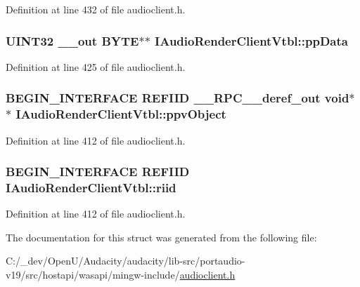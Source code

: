Definition at line 432 of file audioclient.\+h.

\subsubsection[{\texorpdfstring{pp\+Data}{ppData}}]{ U\+I\+N\+T32 {\bf \+\_\+\+\_\+out} {\bf B\+Y\+TE}$\ast$$\ast$ I\+Audio\+Render\+Client\+Vtbl\+::pp\+Data}\hypertarget{struct_i_audio_render_client_vtbl_a50063af1e9bd8c7528f180f3fe00afbb}{}\label{struct_i_audio_render_client_vtbl_a50063af1e9bd8c7528f180f3fe00afbb}


Definition at line 425 of file audioclient.\+h.

\subsubsection[{\texorpdfstring{ppv\+Object}{ppvObject}}]{\setlength{\rightskip}{0pt plus 5cm}B\+E\+G\+I\+N\+\_\+\+I\+N\+T\+E\+R\+F\+A\+CE {\bf R\+E\+F\+I\+ID} {\bf \+\_\+\+\_\+\+R\+P\+C\+\_\+\+\_\+deref\+\_\+out} {\bf void}$\ast$$\ast$ I\+Audio\+Render\+Client\+Vtbl\+::ppv\+Object}\hypertarget{struct_i_audio_render_client_vtbl_af8c00fd1e916873b122146d7c592da09}{}\label{struct_i_audio_render_client_vtbl_af8c00fd1e916873b122146d7c592da09}


Definition at line 412 of file audioclient.\+h.

\subsubsection[{\texorpdfstring{riid}{riid}}]{\setlength{\rightskip}{0pt plus 5cm}B\+E\+G\+I\+N\+\_\+\+I\+N\+T\+E\+R\+F\+A\+CE {\bf R\+E\+F\+I\+ID} I\+Audio\+Render\+Client\+Vtbl\+::riid}\hypertarget{struct_i_audio_render_client_vtbl_ac7a3b16f458323acde4d00ab613aa158}{}\label{struct_i_audio_render_client_vtbl_ac7a3b16f458323acde4d00ab613aa158}


Definition at line 412 of file audioclient.\+h.



The documentation for this struct was generated from the following file\+:\begin{DoxyCompactItemize}
\item 
C\+:/\+\_\+dev/\+Open\+U/\+Audacity/audacity/lib-\/src/portaudio-\/v19/src/hostapi/wasapi/mingw-\/include/\hyperlink{audioclient_8h}{audioclient.\+h}\end{DoxyCompactItemize}
